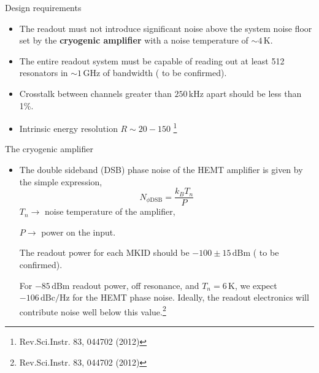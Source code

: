 \documentclass[ignorenonframetext,12pt]{beamer}
\begin{document}
\begin{frame}{Design requirements}
				\begin{itemize}
								\item The readout must not introduce significant noise above the
												system noise floor set by the \textbf{cryogenic
												amplifier} with a noise temperature of $\sim
												4\,\text{K}$.
								\item The entire readout system must be capable of
												reading out at least \alert{512 resonators} in $\sim
												1\,\text{GHz}$ of bandwidth ({\color{red} to be
												confirmed}).
								\item \alert{Crosstalk} between channels greater than
												$250\,\text{kHz}$ apart should be less than \alert{1\%}.
								\item Intrinsic energy resolution \alert{$R \sim 20-150$}
												\footnote{Rev.Sci.Instr. 83, 044702 (2012)}
				\end{itemize}
\end{frame}

\begin{frame}{The cryogenic amplifier}
				\begin{itemize}
								\item The double sideband (DSB) phase noise of the HEMT
												amplifier is given by the simple expression, 
												{\color{red}
												\begin{equation}
																N_{\phi \text{DSB}} = \frac{k_B T_n}{P}
												\end{equation}} 
												$T_n \to$ noise temperature of the amplifier, 

												$P \to$ power on the input. 
												
												The readout power for each MKID should be $-100 \pm
												15\,\text{dBm}$ ({\color{red} to be confirmed}). 
												
												For	$-85\,\text{dBm}$ readout power, off resonance, and $T_n
												= 6\,\text{K}$, we expect $-106\,\text{dBc/Hz}$ for the
												HEMT phase noise. Ideally, the readout electronics will
												contribute noise well below this
												value.\footnote{Rev.Sci.Instr. 83, 044702 (2012)}
				\end{itemize}
\end{frame}
\end{document}
